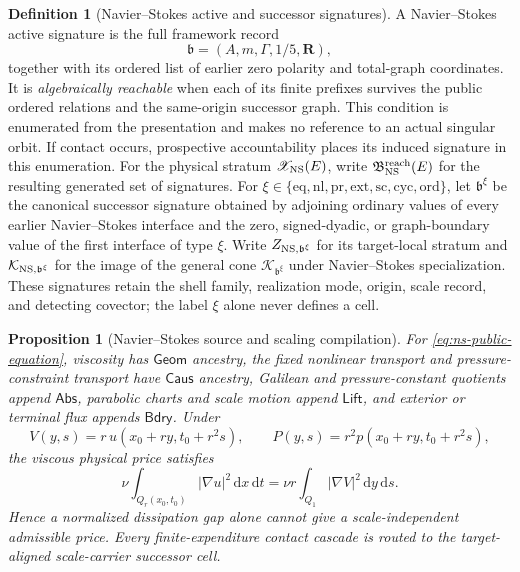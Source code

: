 \documentclass[11pt]{article}
\numberwithin{section}{part}
\theoremstyle{plain}
\newtheorem{proposition}[proposition]{Proposition}
\theoremstyle{definition}
\newtheorem{definition}[definition]{Definition}
\theoremstyle{remark}
\newcommand{\dd}{\,\mathrm d}
\newcommand{\Geom}{\mathsf{Geom}}
\newcommand{\Caus}{\mathsf{Caus}}
\newcommand{\Abs}{\mathsf{Abs}}
\newcommand{\Lift}{\mathsf{Lift}}
\newcommand{\Bdry}{\mathsf{Bdry}}
\begin{document}
\begin{definition}[Navier--Stokes active and successor signatures]
\label{def:ns-active-successor-signatures}
A Navier--Stokes active signature is the full framework record
\[
 \mathfrak b=(A,m,\Gamma,1/5,\mathbf R),
\]
together with its ordered list of earlier zero polarity and total-graph
coordinates.  It is \emph{algebraically reachable} when each of its finite
prefixes survives the public ordered relations and the same-origin successor
graph.  This condition is enumerated from the presentation and makes no
reference to an actual singular orbit.  If contact occurs, prospective
accountability places its induced signature in this enumeration.  For
the physical stratum \(\mathscr X_{\rm NS}(E)\), write
\(\mathfrak B_{\rm NS}^{\rm reach}(E)\) for the resulting generated set of
signatures.  For
\(\xi\in\{\mathrm{eq,nl,pr,ext,sc,cyc,ord}\}\), let
\(\mathfrak b^\xi\) be the canonical successor signature obtained by
adjoining ordinary values of every earlier Navier--Stokes interface and the
zero, signed-dyadic, or graph-boundary value of the first interface of type
\(\xi\).  Write \(Z_{{\rm NS},\mathfrak b^\xi}\) for its target-local
stratum and \(\mathcal K_{{\rm NS},\mathfrak b^\xi}\) for the image of the
general cone \(\mathcal K_{\mathfrak b^\xi}\) under Navier--Stokes
specialization.  These signatures retain the shell family, realization mode,
origin, scale record, and detecting covector; the label \(\xi\) alone never
defines a cell.
\end{definition}

\begin{proposition}[Navier--Stokes source and scaling compilation]
\label{prop:ns-source-scaling-compilation}
For \eqref{eq:ns-public-equation}, viscosity has \(\Geom\) ancestry, the
fixed nonlinear transport and pressure-constraint transport have \(\Caus\)
ancestry, Galilean and pressure-constant quotients append \(\Abs\), parabolic
charts and scale motion append \(\Lift\), and exterior or terminal flux
appends \(\Bdry\).  Under
\[
 V(y,s)=r\,u(x_0+ry,t_0+r^2s),
 \qquad P(y,s)=r^2p(x_0+ry,t_0+r^2s),
\]
the viscous physical price satisfies
\begin{equation}
 \label{eq:ns-viscous-price-scaling}
 \nu\int_{Q_r(x_0,t_0)}|\nabla u|^2\dd x\dd t
 =\nu r\int_{Q_1}|\nabla V|^2\dd y\dd s.
\end{equation}
Hence a normalized dissipation gap alone cannot give a scale-independent
admissible price.  Every finite-expenditure contact cascade is routed to the target-aligned
scale-carrier successor cell.
\end{proposition}
\end{document}
